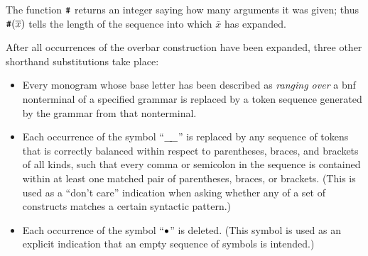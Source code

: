 The function $\hbox{\tt\#}$ returns an integer saying how many arguments it was given; thus $\hbox{\tt\#}(\overline{x})$ tells the length of the sequence into which $\bar{x}$ has expanded.

After all occurrences of the overbar construction have been expanded, three other shorthand substitutions take place:
\begin{itemize}
\item Every monogram whose base letter has been described as \emph{ranging over} a {\sc bnf} nonterminal of a specified grammar is replaced by a token sequence generated by the grammar from that nonterminal.
\item Each occurrence of the symbol ``$\_\!\_$'' is replaced by any sequence of tokens that is correctly balanced within respect to parentheses, braces, and brackets of all kinds,
such that every comma or semicolon in the sequence is contained within at least one matched pair of parentheses, braces, or brackets. (This is used as a ``don't care'' indication when asking whether any of a set of constructs matches a certain syntactic pattern.)
\item Each occurrence of the symbol ``$\bullet$'' is deleted.  (This symbol is used as an explicit indication that an empty sequence of symbols is intended.)
\end{itemize}

